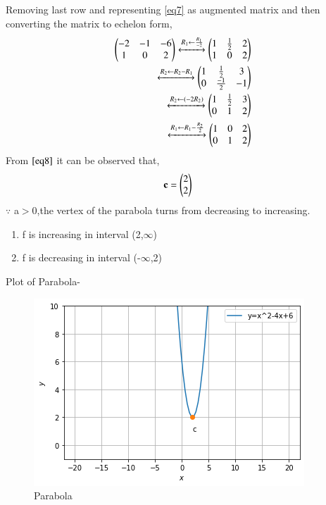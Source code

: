 \documentclass[journal,12pt,twocolumn]{IEEEtran}
\begin{document}
Removing last row and representing \eqref{eq7} as augmented matrix and then converting the matrix to echelon form,
\begin{align}
\begin{pmatrix}-2 & -1 & -6\\1 & 0 & 2\end{pmatrix} 
\xleftrightarrow{R_1\leftarrow \frac{R_1}{-2}}\begin{pmatrix}1 & \frac{1}{2} & 2\\1 & 0 & 2\end{pmatrix} 
\\
\xleftrightarrow{R_2\leftarrow R_2 -R_1}\begin{pmatrix}1 & \frac{1}{2} & 3 \\0 & \frac{-1}{2} & -1\end{pmatrix}
\\
\xleftrightarrow{R_2\leftarrow (-2R_2)}\begin{pmatrix}1 & \frac{1}{2} & 3 \\0 & 1 & 2\end{pmatrix}
\\
\xleftrightarrow{R_1\leftarrow R_1 - \frac{R_2}{2}}\begin{pmatrix}1 & 0 & 2\\0 & 1 & 2\end{pmatrix}   \label{eq8}
\end{align}
From $\eqref{eq8}$ it can be observed that,
\begin{align}
\mathbf{c} &= \begin{pmatrix}2 \\ 2\end{pmatrix}
\end{align}
$\because$ a$>$0,the vertex of the parabola turns from decreasing to increasing.

\begin{enumerate}
\item f is increasing in interval (2,$\infty$)
\item f is decreasing in interval (-$\infty$,2)
\end{enumerate}

Plot of Parabola-
\begin{figure}[ht]
    \centering
    \includegraphics[width=\columnwidth]{Figure.png}
    \caption{Parabola}
    \label{fig:Prarabola}
\end{figure}    
\end{document}
